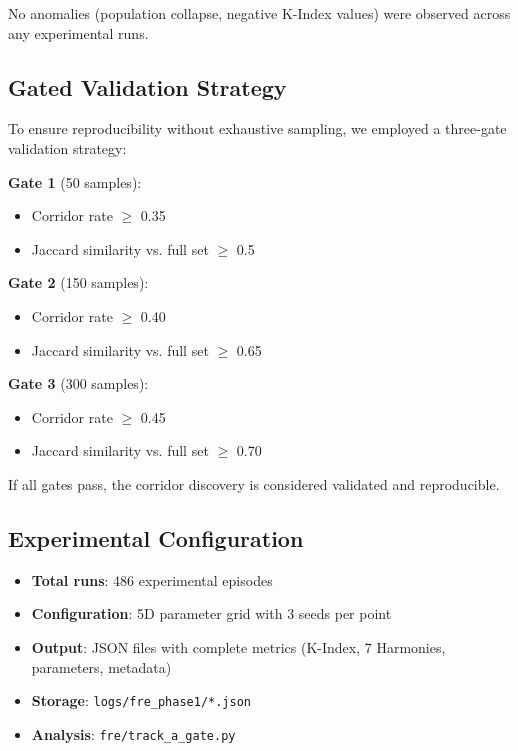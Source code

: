 \documentclass[10pt,letterpaper]{article}
\begin{document}
No anomalies (population collapse, negative K-Index values) were observed across any experimental runs.

\subsection*{Gated Validation Strategy}

To ensure reproducibility without exhaustive sampling, we employed a three-gate validation strategy:

\textbf{Gate 1} (50 samples):
\begin{itemize}
    \item Corridor rate $\geq$ 0.35
    \item Jaccard similarity vs. full set $\geq$ 0.5
\end{itemize}

\textbf{Gate 2} (150 samples):
\begin{itemize}
    \item Corridor rate $\geq$ 0.40
    \item Jaccard similarity vs. full set $\geq$ 0.65
\end{itemize}

\textbf{Gate 3} (300 samples):
\begin{itemize}
    \item Corridor rate $\geq$ 0.45
    \item Jaccard similarity vs. full set $\geq$ 0.70
\end{itemize}

If all gates pass, the corridor discovery is considered validated and reproducible.

\subsection*{Experimental Configuration}

\begin{itemize}
    \item \textbf{Total runs}: 486 experimental episodes
    \item \textbf{Configuration}: 5D parameter grid with 3 seeds per point
    \item \textbf{Output}: JSON files with complete metrics (K-Index, 7 Harmonies, parameters, metadata)
    \item \textbf{Storage}: \texttt{logs/fre\_phase1/*.json}
    \item \textbf{Analysis}: \texttt{fre/track\_a\_gate.py}
\end{itemize}
\end{document}
